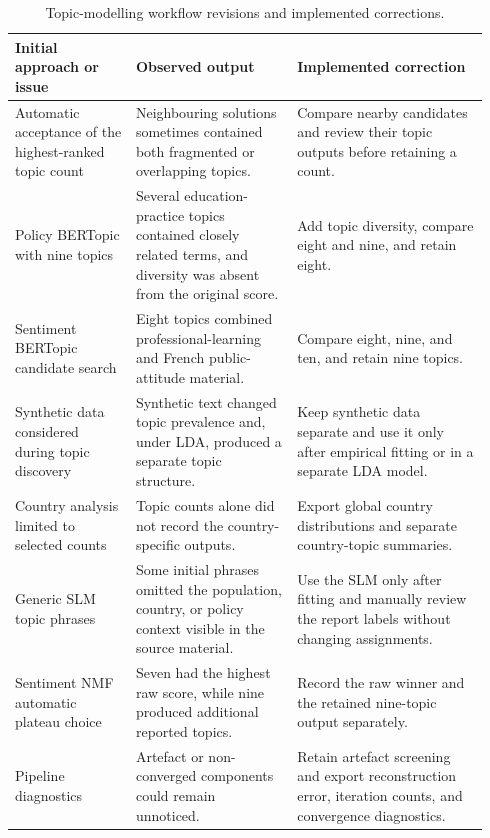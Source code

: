 \begin{table}[!htbp]
\centering
\footnotesize
\renewcommand{\arraystretch}{1.0}
\setlength{\tabcolsep}{3pt}
\begin{tabular}{
>{\raggedright\arraybackslash}p{0.24\linewidth}
>{\raggedright\arraybackslash}p{0.32\linewidth}
>{\raggedright\arraybackslash}p{0.38\linewidth}
}
\hline
Initial approach or issue & Observed output & Implemented correction \\
\hline
Automatic acceptance of the highest-ranked topic count & Neighbouring solutions
sometimes contained both fragmented or overlapping topics. & Compare nearby candidates and review their topic outputs before retaining a count. \\[2pt]
Policy BERTopic with nine topics & Several education-practice topics contained
closely related terms, and diversity was absent from the original score. & Add topic
diversity, compare eight and nine, and retain eight. \\[1pt]
Sentiment BERTopic candidate search & Eight topics combined professional-learning
and French public-attitude material. & Compare eight, nine, and ten, and retain nine topics. \\
Synthetic data considered during topic discovery & Synthetic text changed topic
prevalence and, under LDA, produced a separate topic structure. & Keep synthetic data
separate and use it only after empirical fitting or in a separate LDA model. \\[1pt]
Country analysis limited to selected counts & Topic counts alone did not record the
country-specific outputs. & Export global country distributions and separate
country-topic summaries. \\[1pt]
Generic SLM topic phrases & Some initial phrases omitted the population, country, or
policy context visible in the source material. & Use the SLM only after fitting and
manually review the report labels without changing assignments. \\[1pt]
Sentiment NMF automatic plateau choice & Seven had the highest raw score, while nine
produced additional reported topics. & Record the raw winner and the retained
nine-topic output separately. \\[1pt]
Pipeline diagnostics & Artefact or non-converged components could remain unnoticed.
& Retain artefact screening and export reconstruction error, iteration counts, and
convergence diagnostics. \\
\hline
\end{tabular}
\caption{Topic-modelling workflow revisions and implemented corrections.}
\label{tab:impl-workflow-iterations}
\end{table}



